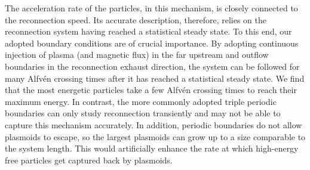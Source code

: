 \documentclass[twocolumn,twocolappendix]{aastex63}
\begin{document}
{The acceleration rate of the particles, in this mechanism,
is closely connected to the reconnection speed. 
Its accurate description, therefore, relies on 
the reconnection system having reached a statistical steady
state. To this end, our adopted boundary conditions    
are of crucial importance. By adopting continuous
injection of plasma (and magnetic flux) in the far upstream and outflow boundaries in the 
reconnection exhaust direction, the system can be followed for many Alfv\'en crossing times
after it has reached a statistical steady state. We find that the most energetic particles take
a few Alfv\'en crossing times to reach their maximum energy. In contrast, the more commonly adopted triple periodic
boundaries can only study reconnection transiently  and may not be able to capture
this mechanism accurately. In addition, periodic boundaries do not allow plasmoids to escape, so the largest plasmoids can grow up to a size comparable to the system length. This would artificially enhance the rate at which high-energy free particles get captured back by plasmoids.}


\end{document}
